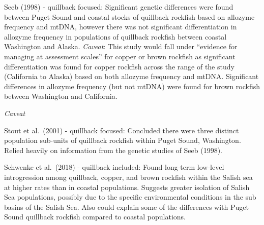\documentclass[11pt,
  english,
  letterpaper,
]{article}
\begin{document}
Seeb {(1998)\leavevmode\tagmcend\tagstructend} - quillback focused: Significant genetic differences were found between Puget Sound and coastal stocks of quillback rockfish based on allozyme frequency and mtDNA, however there was not significant differentiation in allozyme frequency in populations of quillback rockfish between coastal Washington and Alaska. \emph{Caveat}: This study would fall under ``evidence for managing at assessment scales'' for copper or brown rockfish as significant differentiation was found for copper rockfish across the range of the study (California to Alaska) based on both allozyme frequency and mtDNA. Significant differences in allozyme frequency (but not mtDNA) were found for brown rockfish between Washington and California.

\leavevmode\tagmcend\tagstructend\par


\emph{Caveat}

\leavevmode\tagmcend\tagstructend\par


Stout et al.~{(2001)\leavevmode\tagmcend\tagstructend} - quillback focused: Concluded there were three distinct population sub-units of quillback rockfish within Puget Sound, Washington. Relied heavily on information from the genetic studies of Seeb {(1998)\leavevmode\tagmcend\tagstructend}.

\leavevmode\tagmcend\tagstructend\par


Schwenke et al.~{(2018)\leavevmode\tagmcend\tagstructend} - quillback included: Found long-term low-level introgression among quillback, copper, and brown rockfish within the Salish sea at higher rates than in coastal populations. Suggests greater isolation of Salish Sea populations, possibly due to the specific environmental conditions in the sub basins of the Salish Sea. Also could explain some of the differences with Puget Sound quillback rockfish compared to coastal populations.

\leavevmode\tagmcend\tagstructend\par
\end{document}

